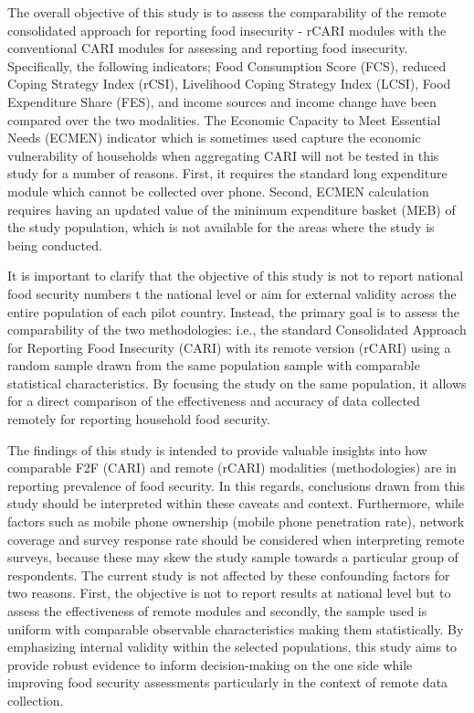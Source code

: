 \documentclass[11pt,harvard]{article}
\begin{document}
	The overall objective of this study is to assess the comparability of the remote consolidated approach for reporting food insecurity - rCARI modules with the conventional CARI modules for assessing and reporting food insecurity. Specifically, the following indicators; Food Consumption Score (FCS), reduced Coping Strategy Index (rCSI), Livelihood Coping Strategy Index (LCSI), Food Expenditure Share (FES), and income sources and income change have been compared over the two modalities. The Economic Capacity to Meet Essential Needs (ECMEN) indicator which is sometimes used capture the economic vulnerability of households when aggregating CARI will not be tested in this study for a number of reasons. First, it requires the standard long expenditure module which cannot be collected over phone. Second, ECMEN calculation requires having an updated value of the minimum expenditure basket (MEB) of the study population, which is not available for the areas where the study is being conducted.
	
	It is important to clarify that the objective of this study is not to report national food security numbers t the national level or aim for external validity across the entire population of each pilot country. Instead, the primary goal is to assess the comparability of the two methodologies: i.e., the standard Consolidated Approach for Reporting Food Insecurity (CARI) with its remote version (rCARI) using a random sample drawn from the same population sample with comparable statistical characteristics. By focusing the study on the same population, it allows for a direct comparison of the effectiveness and accuracy of data collected remotely for reporting household food security. 
	
	The findings of this study is intended to provide valuable insights into how comparable F2F (CARI) and remote (rCARI) modalities (methodologies) are in reporting prevalence of food security. In this regards, conclusions drawn from this study should be interpreted within these caveats and context. Furthermore, while factors such as mobile phone ownership (mobile phone penetration rate), network coverage and survey response rate should be considered when interpreting remote surveys, because these may skew the study sample towards a particular group of respondents. The current study is not affected by these confounding factors for two reasons. First, the objective is not to report results at national level but to assess the effectiveness of remote modules and secondly, the sample used is uniform with comparable observable characteristics making them statistically. By emphasizing internal validity within the selected populations, this study aims to provide robust evidence to inform decision-making on the one side while improving food security assessments particularly in the context of remote data collection.
\end{document}
